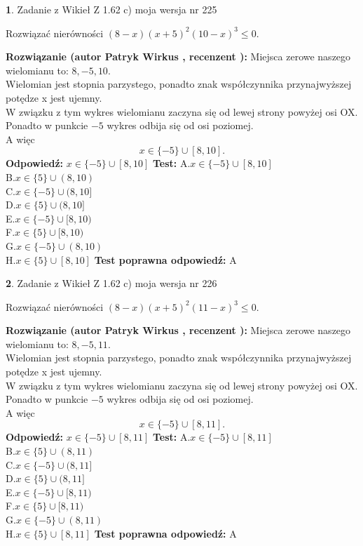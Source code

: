 \documentclass[12pt, a4paper]{article}
\theoremstyle{definition} %
\newtheorem{zad}{}
\newcommand{\zadStart}[1]{\begin{zad}#1\newline}
\newcommand{\zadStop}{\end{zad}}
\newcommand{\rozwStart}[2]{\noindent \textbf{Rozwiązanie (autor #1 , recenzent #2): }\newline}
\newcommand{\rozwStop}{\newline}
\newcommand{\odpStart}{\noindent \textbf{Odpowiedź:}\newline}
\newcommand{\odpStop}{\newline}
\newcommand{\testStart}{\noindent \textbf{Test:}\newline}
\newcommand{\testStop}{\newline}
\newcommand{\kluczStart}{\noindent \textbf{Test poprawna odpowiedź:}\newline}
\newcommand{\kluczStop}{\newline}
\begin{document}
\zadStart{Zadanie z Wikieł Z 1.62 c) moja wersja nr 225}

Rozwiązać nierówności $(8-x)(x+5)^{2}(10-x)^{3}\le0$.
\zadStop
\rozwStart{Patryk Wirkus}{}
Miejsca zerowe naszego wielomianu to: $8, -5, 10$.\\
Wielomian jest stopnia parzystego, ponadto znak współczynnika przy\linebreak najwyższej potędze x jest ujemny.\\ W związku z tym wykres wielomianu zaczyna się od lewej strony powyżej osi OX.\\
Ponadto w punkcie $-5$ wykres odbija się od osi poziomej.\\
A więc $$x \in \{-5\} \cup [8,10].$$
\rozwStop
\odpStart
$x \in \{-5\} \cup [8,10]$
\odpStop
\testStart
A.$x \in \{-5\} \cup [8,10]$\\
B.$x \in \{5\} \cup (8,10)$\\
C.$x \in \{-5\} \cup (8,10]$\\
D.$x \in \{5\} \cup (8,10]$\\
E.$x \in \{-5\} \cup [8,10)$\\
F.$x \in \{5\} \cup [8,10)$\\
G.$x \in \{-5\} \cup (8,10)$\\
H.$x \in \{5\} \cup [8,10]$
\testStop
\kluczStart
A
\kluczStop



\zadStart{Zadanie z Wikieł Z 1.62 c) moja wersja nr 226}

Rozwiązać nierówności $(8-x)(x+5)^{2}(11-x)^{3}\le0$.
\zadStop
\rozwStart{Patryk Wirkus}{}
Miejsca zerowe naszego wielomianu to: $8, -5, 11$.\\
Wielomian jest stopnia parzystego, ponadto znak współczynnika przy\linebreak najwyższej potędze x jest ujemny.\\ W związku z tym wykres wielomianu zaczyna się od lewej strony powyżej osi OX.\\
Ponadto w punkcie $-5$ wykres odbija się od osi poziomej.\\
A więc $$x \in \{-5\} \cup [8,11].$$
\rozwStop
\odpStart
$x \in \{-5\} \cup [8,11]$
\odpStop
\testStart
A.$x \in \{-5\} \cup [8,11]$\\
B.$x \in \{5\} \cup (8,11)$\\
C.$x \in \{-5\} \cup (8,11]$\\
D.$x \in \{5\} \cup (8,11]$\\
E.$x \in \{-5\} \cup [8,11)$\\
F.$x \in \{5\} \cup [8,11)$\\
G.$x \in \{-5\} \cup (8,11)$\\
H.$x \in \{5\} \cup [8,11]$
\testStop
\kluczStart
A
\kluczStop
\end{document}
